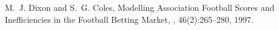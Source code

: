 \begin{thebibliography}{}
M.~J. Dixon and S.~G. Coles,
\newblock Modelling Association Football Scores and Inefficiencies in the Football Betting Market,
, 46(2):265--280, 1997.

\end{thebibliography}